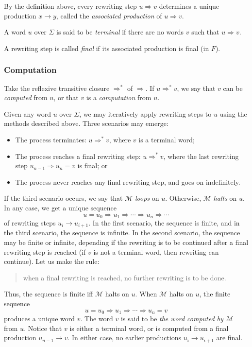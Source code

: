 \documentclass[12pt]{article}
\begin{document}
By the definition above, every rewriting step $u\Rightarrow v$ determines a unique production $x\to y$, called the \emph{associated production} of $u\Rightarrow v$.  

A word $u$ over $\Sigma$ is said to be \emph{terminal} if there are no words $v$ such that $u\Rightarrow v$.

A rewriting step is called \emph{final} if its associated production is final (in $F$).

\subsubsection*{Computation}

Take the reflexive transitive closure $\Rightarrow^*$ of $\Rightarrow$.  If $u\Rightarrow^* v$, we say that $v$ can be \emph{computed} from $u$, or that $v$ is a \emph{computation} from $u$.

Given any word $u$ over $\Sigma$, we may iteratively apply rewriting steps to $u$ using the methods described above.  Three scenarios may emerge:
\begin{itemize}
\item The process terminates: $u\Rightarrow^* v$, where $v$ is a terminal word;
\item The process reaches a final rewriting step: $u\Rightarrow^* v$, where the last rewriting step $u_{n-1} \Rightarrow u_n = v$ is final; or
\item The process never reaches any final rewriting step, and goes on indefinitely.
\end{itemize}

If the third scenario occurs, we say that $\mathscr{M}$ \emph{loops} on $u$.  Otherwise, $\mathscr{M}$ \emph{halts} on $u$.  In any case, we get a unique sequence 
$$u=u_0 \Rightarrow u_1 \Rightarrow \cdots \Rightarrow u_n \Rightarrow \cdots$$
of rewriting steps $u_i\to u_{i+1}$.  In the first scenario, the sequence is finite, and in the third scenario, the sequence is infinite.  In the second scenario, the sequence may be finite or infinite, depending if the rewriting is to be continued after a final rewriting step is reached (if $v$ is not a terminal word, then rewriting can continue).  Let us make the rule:
\begin{quote}
when a final rewriting is reached, no further rewriting is to be done.  
\end{quote}
Thus, the sequence is finite iff $\mathscr{M}$ halts on $u$.  When $\mathscr{M}$ halts on $u$, the finite sequence 
$$u=u_0 \Rightarrow u_1 \Rightarrow \cdots \Rightarrow u_n = v$$
produces a unique word $v$.  The word $v$ is said to be \emph{the word computed by} $\mathscr{M}$ from $u$.  Notice that $v$ is either a terminal word, or is computed from a final production $u_{n-1} \to v$.  In either case, no earlier productions $u_i\to u_{i+1}$ are final.
\end{document}
